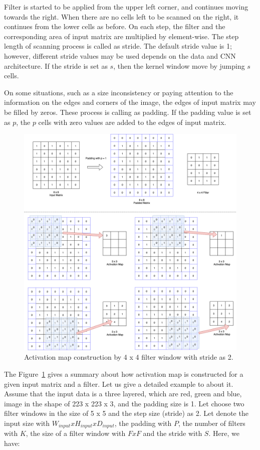 Filter is started to be applied from the upper left corner, and continues moving towards the right. When there are no cells left to be scanned on the right, it continues from the lower cells as before. On each step, the filter and the corresponding area of input matrix are multiplied by element-wise. The step length of scanning process is called as stride. The default stride value is 1; however, different stride values may be used depends on the data and CNN architecture. If the stride is set as $s$, then the kernel window move by jumping $s$ cells.

On some situations, such as a size inconsistency or paying attention to the information on the edges and corners of the image, the edges of input matrix may be filled by zeros. These process is calling as padding. If the padding value is set as $p$, the $p$ cells with zero values are added to the edges of input matrix.

\begin{figure}[h]
	\centering
	\includegraphics[width=\linewidth]{fig/conv_layer.png}
	\vspace*{2mm}
	\caption{Activation map construction by 4 x 4 filter window with stride as 2.}
	\label{conv_layer}
\end{figure}

The Figure~\ref{conv_layer} gives a summary about how activation map is constructed for a given input matrix and a filter. Let us give a detailed example to about it. Assume that the input data is a three layered, which are red, green and blue, image in the shape of 223 x 223 x 3, and the padding size is 1. Let choose two filter windows in the size of 5 x 5 and the step size (stride) as 2. Let denote the input size with $W_{input} x H_{input} x D_{input}$, the padding with $P$, the number of filters with $K$, the size of a filter window with $F x F$ and the stride with $S$. Here, we have:

